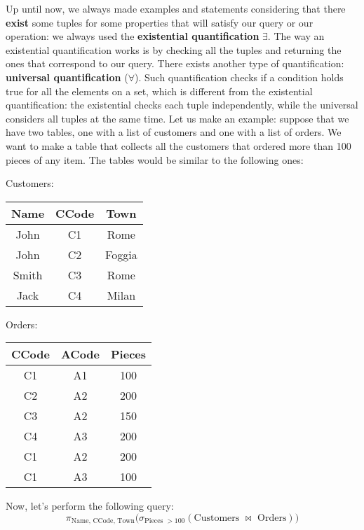 Up until now, we always made examples and statements considering that there \textbf{exist} some tuples for some properties that will satisfy our query or our operation: we always used the \textbf{existential quantification} $\exists$. The way an existential quantification works is by checking all the tuples and returning the ones that correspond to our query.
\nwl
There exists another type of quantification: \textbf{universal quantification} ($\forall$). Such quantification checks if a condition holds true for all the elements on a set, which is different from the existential quantification: the existential checks each tuple independently, while the universal considers all tuples at the same time.
\nwl
Let us make an example: suppose that we have two tables, one with a list of customers and one with a list of orders. We want to make a table that collects all the customers that ordered more than 100 pieces of any item. The tables would be similar to the following ones:
\begin{center}
    Customers: \quad
    \begin{tabular}{|c|c|c|}
        \hline \rowcolor{maindoccol!60}
        \textbf{Name} & \textbf{CCode} & \textbf{Town} \\
        \hline
        John & C1 & Rome \\
        \hline
        John & C2 & Foggia \\
        \hline
        Smith & C3 & Rome \\
        \hline
        Jack & C4 & Milan \\
        \hline
    \end{tabular}
    \quad
    Orders: \quad
    \begin{tabular}{|c|c|c|}
        \hline \rowcolor{maindoccol!60}
        \textbf{CCode} & \textbf{ACode} & \textbf{Pieces} \\
        \hline
        C1 & A1 & 100 \\
        \hline
        C2 & A2 & 200 \\
        \hline
        C3 & A2 & 150 \\
        \hline
        C4 & A3 & 200 \\
        \hline
        C1 & A2 & 200 \\
        \hline
        C1 & A3 & 100 \\
        \hline
    \end{tabular}
\end{center}

Now, let's perform the following query:
\[ \pi_{\text{Name, CCode, Town}} \big( \sigma_{\text{Pieces } > 100}(\text{Customers } \bowtie \text{ Orders})\big) \]

